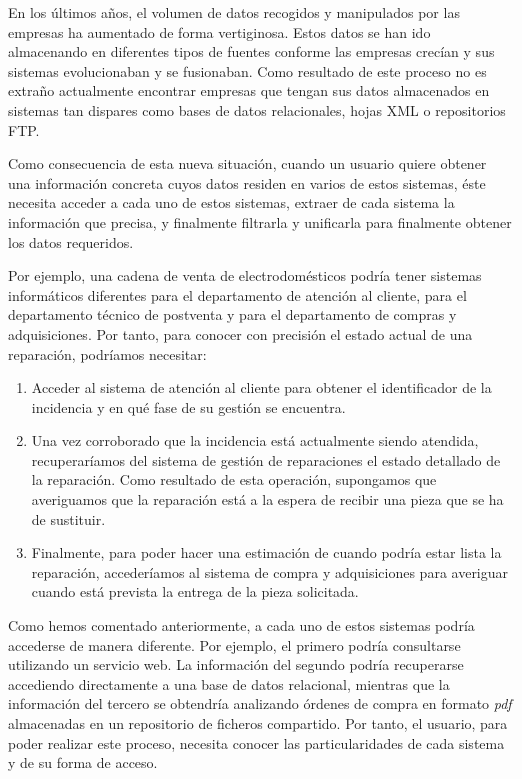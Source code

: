 En los últimos años, el volumen de datos recogidos y manipulados por las empresas ha aumentado de forma vertiginosa. Estos datos se han ido almacenando en diferentes tipos de fuentes conforme las empresas crecían y sus sistemas evolucionaban y se fusionaban. Como resultado de  este proceso no es extraño actualmente encontrar empresas que tengan sus datos almacenados en sistemas tan dispares como bases de datos relacionales, hojas XML o repositorios FTP.

Como consecuencia de esta nueva situación, cuando un usuario quiere obtener una información concreta cuyos datos residen en varios de estos sistemas, éste necesita acceder a cada uno de estos sistemas, extraer de cada sistema la información que precisa, y finalmente filtrarla y unificarla para finalmente obtener los datos requeridos.

Por ejemplo, una cadena de venta de electrodomésticos podría tener sistemas informáticos diferentes para el departamento de atención al cliente, para el departamento técnico de postventa y para el departamento de compras y adquisiciones. Por tanto, para conocer con precisión el estado actual de una reparación, podríamos necesitar:

\begin{enumerate}
	\item Acceder al sistema de atención al cliente para obtener el identificador de la incidencia y en qué fase de su gestión se encuentra.
	\item Una vez corroborado que la incidencia está actualmente siendo atendida, recuperaríamos del sistema de gestión de reparaciones el estado detallado de la reparación. Como resultado de esta operación, supongamos que averiguamos que la reparación está a la espera de recibir una pieza que se ha de sustituir.
	\item Finalmente, para poder hacer una estimación de cuando podría estar lista la reparación, accederíamos al sistema de compra y adquisiciones para averiguar cuando está prevista la entrega de la pieza solicitada.
\end{enumerate}

Como hemos comentado anteriormente, a cada uno de estos sistemas podría accederse de manera diferente. Por ejemplo, el primero podría consultarse utilizando un servicio web. La información del segundo podría recuperarse accediendo directamente a una base de datos relacional, mientras que la información del tercero se obtendría analizando órdenes de compra en formato \emph{pdf} almacenadas en un repositorio de ficheros compartido. Por tanto, el usuario, para poder realizar este proceso, necesita conocer las particularidades de cada sistema y de su forma de acceso.

